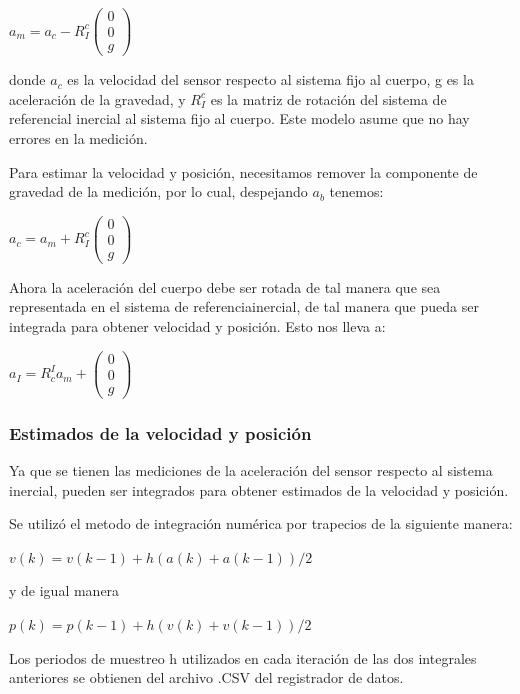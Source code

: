 	${ a }_{ m }={ a }_{ c }-{ R }^{ c }_{ I }\left( \begin{matrix} 0 \\ 0 \\ g \end{matrix} \right)$

	donde ${a}_{c}$ es la velocidad del sensor respecto al sistema fijo al cuerpo, g es la aceleración de la gravedad, y ${R}^{c}_{I}$ es la matriz de rotación del sistema de referencial inercial al sistema fijo al cuerpo. Este modelo asume que no hay errores en la medición.

	Para estimar la velocidad y posición,  necesitamos remover la componente de gravedad de la medición, por lo cual, despejando ${a}_{b}$ tenemos:

	${ a }_{ c }={ a }_{ m }+{ R }^{ c }_{ I }\left( \begin{matrix} 0 \\ 0 \\ g \end{matrix} \right)$

	Ahora la aceleración del cuerpo debe ser rotada de tal manera que sea representada en el sistema de referenciainercial, de tal manera que pueda ser integrada para obtener velocidad y posición. Esto nos lleva a:

	${ a }_{ I }={ R }^{ I }_{ c }{ a }_{ m }+\left( \begin{matrix} 0 \\ 0 \\ g \end{matrix} \right)$


	\subsubsection{Estimados de la velocidad y posición}

	Ya que se tienen las mediciones de la aceleración del sensor respecto al sistema inercial, pueden ser integrados para obtener estimados de la velocidad y posición.

	Se utilizó el metodo de integración numérica por trapecios de la siguiente manera:

	$v\left( k \right) =v\left( k-1 \right) +h\left( a\left( k \right) +a\left( k-1 \right) \right) /2$

	y de igual manera

	$p\left( k \right) =p\left( k-1 \right) +h\left( v\left( k \right) +v\left( k-1 \right) \right) /2$

	Los periodos de muestreo h utilizados en cada iteración de las dos integrales anteriores se obtienen del archivo .CSV del registrador de datos.

